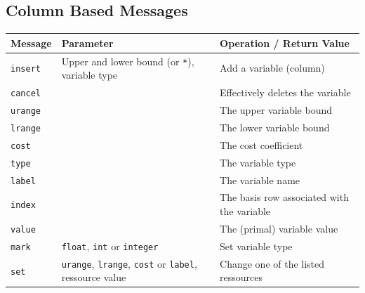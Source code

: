 \documentclass[a4paper,11pt,twoside]{book}
\begin{document}
\subsection{Column Based Messages}
\label{slb_col_messages}
\medskip
\begin{center}
\begin{tabular}{|p{3cm}|p{9cm}|p{12.5cm}|}
\hline
{\bf Message}           & {\bf Parameter} & {\bf Operation / Return Value} \\
\hline
\hline
\verb/insert/           & Upper and lower bound (or \verb/*/), variable type
                        & Add a variable (column) \\
\hline
\verb/cancel/           & 
                        & Effectively deletes the variable \\
\hline
\verb/urange/           & 
                        & The upper variable bound \\
\hline
\verb/lrange/           & 
                        & The lower variable bound \\
\hline
\verb/cost/             & 
                        & The cost coefficient \\
\hline
\verb/type/             & 
                        & The variable type \\
\hline
\verb/label/            & 
                        & The variable name \\
\hline
\verb/index/            & 
                        & The basis row associated with the variable\\
\hline
\verb/value/            & 
                        & The (primal) variable value \\
\hline
\verb/mark/             & \verb/float/, \verb/int/ or \verb/integer/
                        & Set variable type \\
\hline
\verb/set/              & \verb/urange/, \verb/lrange/, \verb/cost/ or
                          \verb/label/, ressource value
                        & Change one of the listed ressources \\
\hline
\end{tabular}
\end{center}


\bigskip
\end{document}
